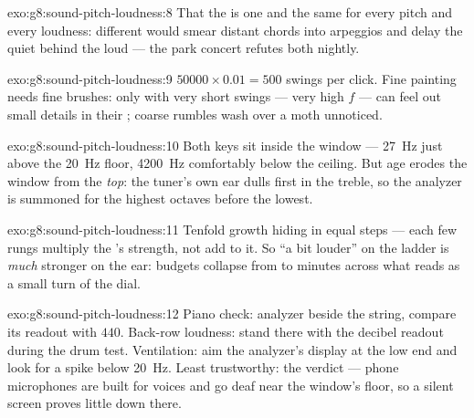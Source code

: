 \begin{solution}{exo:g8:sound-pitch-loudness:8}
That the  is one and the same for every pitch and every
loudness: different  would smear distant chords into
arpeggios and delay the quiet behind the loud --- the park
concert refutes both nightly.
\end{solution}

\begin{solution}{exo:g8:sound-pitch-loudness:9}
$50000 \times 0.01 = 500$ swings per click. Fine painting
needs fine brushes: only  with very short swings
--- very high $f$ --- can feel out small details in their
; coarse  rumbles wash over a moth
unnoticed.
\end{solution}

\begin{solution}{exo:g8:sound-pitch-loudness:10}
Both keys sit inside the window --- \qty{27}{Hz} just above
the \qty{20}{Hz} floor, \qty{4200}{Hz} comfortably below the
ceiling. But age erodes the window from the \emph{top}: the
tuner's own ear dulls first in the treble, so the analyzer is
summoned for the highest octaves before the lowest.
\end{solution}

\begin{solution}{exo:g8:sound-pitch-loudness:11}
Tenfold growth hiding in equal steps --- each few rungs
multiply the 's strength, not add to it. So ``a bit
louder'' on the ladder is \emph{much} stronger on the ear:
budgets collapse from  to minutes across what reads as
a small turn of the dial.
\end{solution}

\begin{solution}{exo:g8:sound-pitch-loudness:12}
Piano check: analyzer beside the string, compare its readout
with $440$. Back-row loudness: stand there with the decibel
readout during the drum test. Ventilation: aim the analyzer's
 display at the low end and look for a spike below
\qty{20}{Hz}. Least trustworthy: the  verdict ---
phone microphones are built for voices and go deaf near the
window's floor, so a silent screen proves little down there.
\end{solution}


